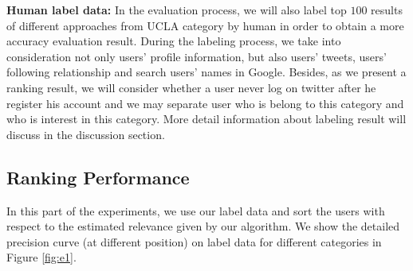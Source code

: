 \documentclass{article}
\begin{document}
\textbf{Human label data:} In the evaluation process, we will also label top $100$ results of different approaches from UCLA category by human in order to obtain a more accuracy evaluation result. During the labeling process, we take into consideration not only users' profile information, but also users' tweets, users' following relationship and search users' names in Google. Besides, as we present a ranking result, we will consider whether a user never log on twitter after he register his account and we may separate user who is belong to this category and who is interest in this category. More detail information about labeling result will discuss in the discussion section.

\subsection{Ranking Performance}
In this part of the experiments, we use our label data and sort the users with respect to the estimated relevance given by our algorithm. We show the detailed precision curve (at different position) on label data for different categories in Figure \ref{fig:e1}.
\end{document}
